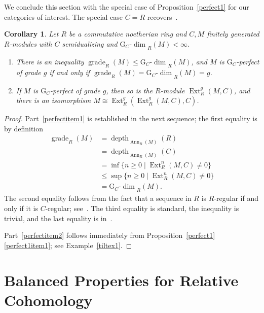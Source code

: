 \documentclass{amsart}
\newtheorem{cor}[lem]{Corollary}
\begin{document}
We conclude this section with the special case of Proposition~\ref{perfect1}
for our categories of interest.  The special case $C=R$ recovers~\cite[(6.3.1,2)]{avramov:aratc}.

\begin{cor} \label{perfect2}
Let $R$ be a commutative noetherian ring and $C,M$ finitely generated $R$-modules
with $C$ semidualizing and ${\mathrm{G}_{{C}}\text{-}\dim}_R(M)<\infty$.
\begin{enumerate}[\quad\rm(a)]
\item \label{perfectitem1}
There is an inequality ${\operatorname{grade}}_R(M){\leqslant}{\mathrm{G}_{{C}}\text{-}\dim}_R(M)$,
and $M$ is $\text{G}_C$-perfect of grade $g$ if and only if
${\operatorname{grade}}_R(M)={\mathrm{G}_{{C}}\text{-}\dim}_R(M)=g$.
\item \label{perfectitem2}
If $M$ is $\text{G}_C$-perfect of grade $g$, then so is the $R$-module
${\operatorname{Ext}}^g_R(M,C)$, and there is an isomorphism
$M\cong{\operatorname{Ext}}^g_R({\operatorname{Ext}}^g_R(M,C),C)$.
\end{enumerate}
\end{cor}

\begin{proof}
Part~\eqref{perfectitem1}
is established in the next sequence; the first  equality is by definition
\begin{align*}
{\operatorname{grade}}_R(M)
&={\operatorname{depth}}_{{\operatorname{Ann}}_R(M)}(R)\\
&={\operatorname{depth}}_{{\operatorname{Ann}}_R(M)}(C) \\
&=\inf\{n{\geqslant} 0\mid{\operatorname{Ext}}^n_R(M,C)\neq 0\}\\
&{\leqslant}\sup\{n{\geqslant} 0\mid{\operatorname{Ext}}^n_R(M,C)\neq 0\}\\
&={\mathrm{G}_{{C}}\text{-}\dim}_R(M).
\end{align*}
The second equality follows from the fact that a sequence in $R$
is $R$-regular if and only if it is $C$-regular; see~\cite[p.\ 68]{golod:gdagpi}.  
The third equality is standard,
the inequality is trivial, and the last equality is in~\cite[(2.1)]{frankild:rrhffd}.

Part~\eqref{perfectitem2} follows immediately from Proposition~\ref{perfect1}\eqref{perfect1item1};
see Example~\ref{tiltex1}.
\end{proof}

\section{Balanced Properties for Relative Cohomology}\label{sec2}
\end{document}
